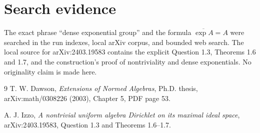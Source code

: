 \documentclass[11pt]{article}
\begin{document}
\section*{Search evidence}

The exact phrase ``dense exponential group'' and the formula
$\overline{\exp A}=A$ were searched in the run indexes, local arXiv corpus,
and bounded web search.  The local source for arXiv:2403.19583 contains the
explicit Question 1.3, Theorems 1.6 and 1.7, and the construction's proof of
nontriviality and dense exponentials.  No originality claim is made here.

\begin{thebibliography}{9}
T. W. Dawson, \emph{Extensions of Normed Algebras}, Ph.D. thesis,
arXiv:math/0308226 (2003), Chapter 5, PDF page 53.

A. J. Izzo, \emph{A nontrivial uniform algebra Dirichlet on its maximal
ideal space}, arXiv:2403.19583, Question 1.3 and Theorems 1.6--1.7.
\end{thebibliography}
\end{document}

